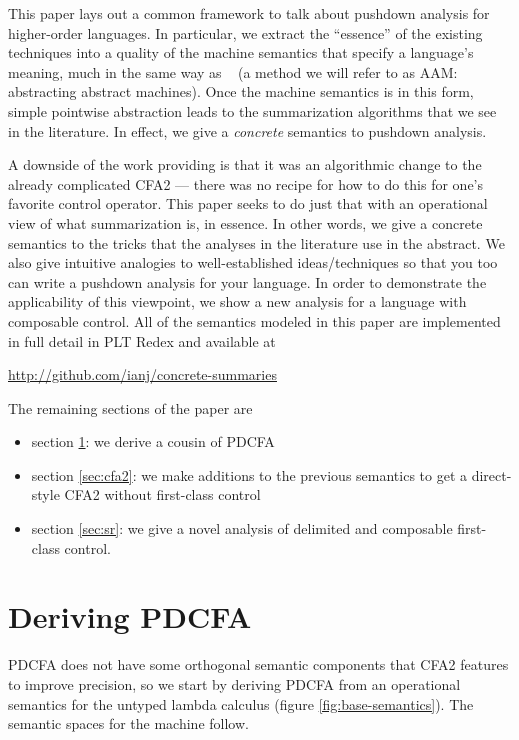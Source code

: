 \documentclass{llncs}
\newcommand{\Scribtexttt}[1]{{\texttt{#1}}}
\newcommand{\SColorize}[2]{\color{#1}{#2}}
\newcommand{\inColor}[2]{{\Scribtexttt{\SColorize{#1}{#2}}}}
\newcommand{\rackett}[1]{\inColor{black}{#1}}
\begin{document}
This paper lays out a common framework to talk about pushdown analysis
for higher-order languages. In particular, we extract the ``essence''
of the existing techniques into a quality of the machine semantics
that specify a language's meaning, much in the same way as
~\citet{dvanhorn:VanHorn2012Systematic} (a method we will refer to as
AAM: abstracting abstract machines). Once the machine semantics is in
this form, simple pointwise abstraction leads to the summarization
algorithms that we see in the literature. In effect, we give a
\emph{concrete} semantics to pushdown analysis.

A downside of the work providing \rackett{call/cc} is that it was an
algorithmic change to the already complicated CFA2 --- there was no
recipe for how to do this for one's favorite control operator. This
paper seeks to do just that with an operational view of what
summarization is, in essence. In other words, we give a concrete
semantics to the tricks that the analyses in the literature use in the
abstract. We also give intuitive analogies to well-established
ideas/techniques so that you too can write a pushdown analysis for
your language. In order to demonstrate the applicability of this
viewpoint, we show a new analysis for a language with composable
control. All of the semantics modeled in this paper are implemented in
full detail in PLT Redex and available at

\begin{center}
  \url{http://github.com/ianj/concrete-summaries}
\end{center}

The remaining sections of the paper are
\begin{itemize}
\item{section \ref{sec:pdcfa}: we derive a cousin of PDCFA}
\item{section \ref{sec:cfa2}: we make additions to the previous semantics to get a direct-style CFA2 without first-class control}
\item{section \ref{sec:sr}: we give a novel analysis of delimited and composable first-class control.}
\end{itemize}

\section{Deriving PDCFA}
\label{sec:pdcfa}

PDCFA does not have some orthogonal semantic components that CFA2
features to improve precision, so we start by deriving PDCFA from an
operational semantics for the untyped lambda calculus (figure
\ref{fig:base-semantics}). The semantic spaces for the machine follow.
\end{document}
